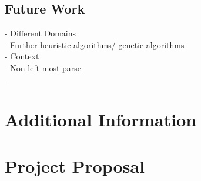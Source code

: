 \documentclass[12pt,a4paper,twoside,openany]{report} \usepackage[pdfborder={0 0 0}]{hyperref}    %
\theoremstyle{definition} \newtheorem{definition}{Definition}[section]
\begin{document}
      \section{Future Work}

      - Different Domains \\
      - Further heuristic algorithms/ genetic algorithms \\
      - Context \\
      - Non left-most parse \\
      - 




      \nocite{ * }

      



      \appendix

      \chapter{Additional Information}

%
%
%
%
%

      \chapter{Project Proposal} \label{chap:proposal} 
\end{document}

